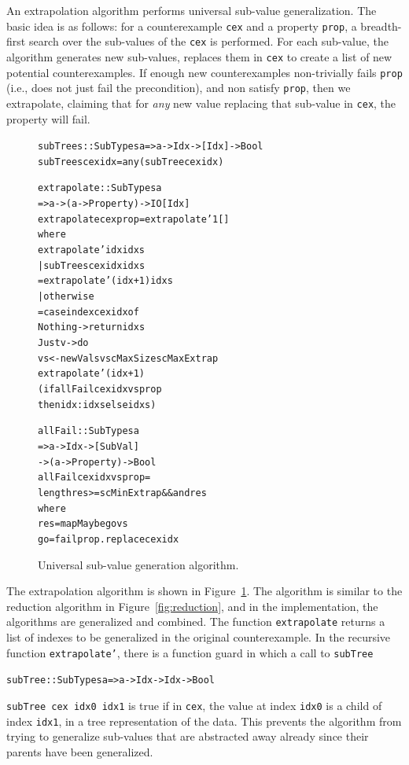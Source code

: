 \documentclass[10pt]{sigplanconf}
\newenvironment{code}{\begin{alltt}}{\end{alltt}}
\newcommand{\ttp}[1]{\texttt{#1}}
\begin{document}
An extrapolation algorithm performs universal sub-value generalization.  The
basic idea is as follows: for a counterexample \ttp{cex} and a property
\ttp{prop}, a breadth-first search over the sub-values of the \ttp{cex} is
performed.  For each sub-value, the algorithm generates new sub-values, replaces
them in \ttp{cex} to create a list of new potential counterexamples.  If enough
new counterexamples non-trivially fails \ttp{prop} (i.e., does not just fail the
precondition), and non satisfy \ttp{prop}, then we extrapolate, claiming that
for \emph{any} new value replacing that sub-value in \ttp{cex}, the property
will fail.

\begin{figure}
  \begin{code}
subTrees :: SubTypes a => a -> Idx -> [Idx] -> Bool
subTrees cex idx = any (subTree cex idx)

extrapolate :: SubTypes a
            => a -> (a -> Property) -> IO [Idx]
extrapolate cex prop = extrapolate' 1 []
  where
  extrapolate' idx idxs
    | subTrees cex idx idxs
    = extrapolate' (idx+1) idxs
    | otherwise
    = case index cex idx of
        Nothing -> return idxs
        Just v  -> do
          vs <- newVals v scMaxSize scMaxExtrap
          extrapolate' (idx+1)
            (if allFail cex idx vs prop
               then idx:idxs else idxs)

allFail :: SubTypes a
        => a -> Idx -> [SubVal]
        -> (a -> Property) -> Bool
allFail cex idx vs prop =
  length res >= scMinExtrap && and res
  where
  res  = mapMaybe go vs
  go   = fail prop . replace cex idx
  \end{code}
  \caption{Universal sub-value generation algorithm.}
  \label{fig:universal}
\end{figure}

The extrapolation algorithm is shown in Figure~\ref{fig:universal}.  The
algorithm is similar to the reduction algorithm in Figure~\ref{fig:reduction},
and in the implementation, the algorithms are generalized and combined.  The
function \ttp{extrapolate} returns a list of indexes to be generalized in the
original counterexample.  In the recursive function \ttp{extrapolate'}, there is
a function guard in which a call to \ttp{subTree}
%
\begin{code}
subTree :: SubTypes a => a -> Idx -> Idx -> Bool
\end{code}
%
\ttp{subTree cex idx0 idx1} is true if in \ttp{cex}, the value at index
\ttp{idx0} is a child of index \ttp{idx1}, in a tree representation of the
data.  This prevents the algorithm from trying to generalize sub-values that are
abstracted away already since their parents have been generalized.
\end{document}
